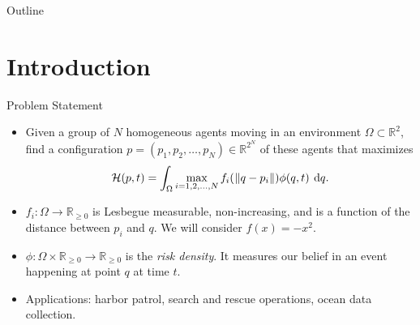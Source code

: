 \documentclass[9pt]{beamer}
\subtitle{Multi-Agent Area Coverage Control Using Reinforcement Learning}
\author{Adekunle Adepegba, Suruz Miah, Davide Spinello \\
Summarized by Simon Hu}
\date{\today}
\newcommand{\R}{\mathbb{R}}
\begin{document}
	
\begin{frame}
\titlepage
\end{frame}
	
\begin{frame}{Outline}
\tableofcontents
\end{frame}

\section{Introduction}
\begin{frame}{Problem Statement}
	\begin{itemize}
		\item Given a group of $N$ homogeneous agents moving in an environment $\Omega \subset \R^2$, find a configuration $p = (p_1, p_2, \dots, p_N) \in \R^{2^N}$ of these agents that maximizes 
		\begin{equation}
			\displaystyle \mathcal{H}(p,t) = \int_{\Omega}{\max\limits_{i=1, 2, \dots, N}{f_i(\:\norm{q - p_i})} \phi(q, t) \: \dif q}.
		\end{equation}
		\item $f_i : \Omega \to \R_{\geq 0}$ is Lesbegue measurable, non-increasing, and is a function of the distance between $p_i$ and $q$. We will consider $f(x) = -x^2$. 
		\item $\phi : \Omega \times \R_{\geq 0} \to \R_{\geq 0}$ is the \textit{risk density}. It measures our belief in an event happening at point $q$ at time $t$. 
		\item Applications: harbor patrol, search and rescue operations, ocean data collection. 
	\end{itemize}
\end{frame}
\end{document}
